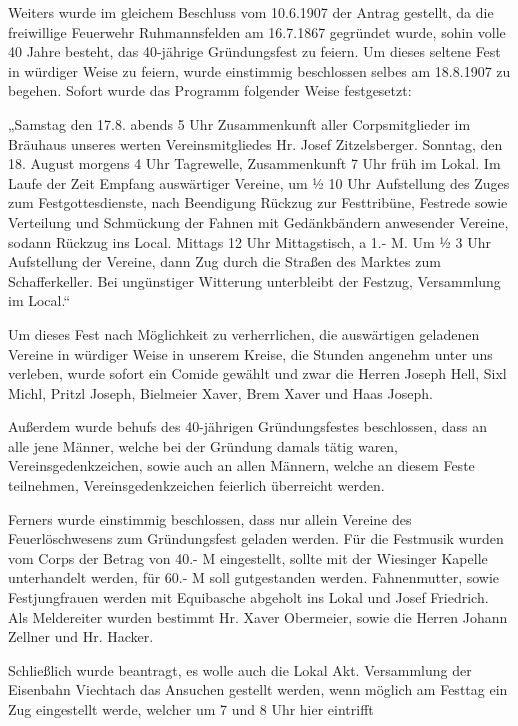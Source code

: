 \documentclass{book}
\begin{document}
Weiters wurde im gleichem Beschluss vom 10.6.1907 der Antrag gestellt, da die
freiwillige Feuerwehr Ruhmannsfelden am 16.7.1867 gegründet wurde, sohin volle
40 Jahre besteht, das 40-jährige Gründungsfest zu feiern. Um dieses seltene Fest
in würdiger Weise zu feiern, wurde einstimmig beschlossen selbes am 18.8.1907 zu
begehen. Sofort wurde das Programm folgender Weise festgesetzt:

„Samstag den 17.8. abends 5 Uhr Zusammenkunft aller Corpsmitglieder im Bräuhaus
unseres werten Vereinsmitgliedes Hr. Josef Zitzelsberger. Sonntag, den 18.
August morgens 4 Uhr Tagrewelle, Zusammenkunft 7 Uhr früh im Lokal. Im Laufe der
Zeit Empfang auswärtiger Vereine, um ½ 10 Uhr Aufstellung des Zuges zum
Festgottesdienste, nach Beendigung Rückzug zur Festtribüne, Festrede sowie
Verteilung und Schmückung der Fahnen mit Gedänkbändern anwesender Vereine,
sodann Rückzug ins Local. Mittags 12 Uhr Mittagstisch, a 1.- M. Um ½ 3 Uhr
Aufstellung der Vereine, dann Zug durch die Straßen des Marktes zum
Schafferkeller. Bei ungünstiger Witterung unterbleibt der Festzug, Versammlung
im Local.“

Um dieses Fest nach Möglichkeit zu verherrlichen, die auswärtigen geladenen
Vereine in würdiger Weise in unserem Kreise, die Stunden angenehm unter uns
verleben, wurde sofort ein Comide gewählt und zwar die Herren Joseph Hell, Sixl
Michl, Pritzl Joseph, Bielmeier Xaver, Brem Xaver und Haas Joseph.

Außerdem wurde behufs des 40-jährigen Gründungsfestes beschlossen, dass an alle
jene Männer, welche bei der Gründung damals tätig waren, Vereinsgedenkzeichen,
sowie auch an allen Männern, welche an diesem Feste teilnehmen,
Vereinsgedenkzeichen feierlich überreicht werden.

Ferners wurde einstimmig beschlossen, dass nur allein Vereine des
Feuerlöschwesens zum Gründungsfest geladen werden. Für die Festmusik wurden vom
Corps der Betrag von 40.- M eingestellt, sollte mit der Wiesinger Kapelle
unterhandelt werden, für 60.- M soll gutgestanden werden. Fahnenmutter, sowie
Festjungfrauen werden mit Equibasche abgeholt ins Lokal und Josef Friedrich. Als
Meldereiter wurden bestimmt Hr. Xaver Obermeier, sowie die Herren Johann Zellner
und Hr. Hacker.

Schließlich wurde beantragt, es wolle auch die Lokal Akt. Versammlung der
Eisenbahn Viechtach das Ansuchen gestellt werden, wenn möglich am Festtag ein
Zug eingestellt werde, welcher um 7 und 8 Uhr hier eintrifft
\end{document}
